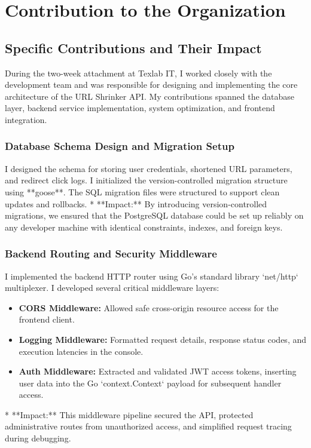 \chapter{Contribution to the Organization}

\section{Specific Contributions and Their Impact}
During the two-week attachment at Texlab IT, I worked closely with the development team and was responsible for designing and implementing the core architecture of the URL Shrinker API. My contributions spanned the database layer, backend service implementation, system optimization, and frontend integration.

\subsection{Database Schema Design and Migration Setup}
I designed the schema for storing user credentials, shortened URL parameters, and redirect click logs. I initialized the version-controlled migration structure using **goose**. The SQL migration files were structured to support clean updates and rollbacks.
*   **Impact:** By introducing version-controlled migrations, we ensured that the PostgreSQL database could be set up reliably on any developer machine with identical constraints, indexes, and foreign keys.

\subsection{Backend Routing and Security Middleware}
I implemented the backend HTTP router using Go's standard library `net/http` multiplexer. I developed several critical middleware layers:
\begin{itemize}
    \item \textbf{CORS Middleware:} Allowed safe cross-origin resource access for the frontend client.
    \item \textbf{Logging Middleware:} Formatted request details, response status codes, and execution latencies in the console.
    \item \textbf{Auth Middleware:} Extracted and validated JWT access tokens, inserting user data into the Go `context.Context` payload for subsequent handler access.
\end{itemize}
*   **Impact:** This middleware pipeline secured the API, protected administrative routes from unauthorized access, and simplified request tracing during debugging.

